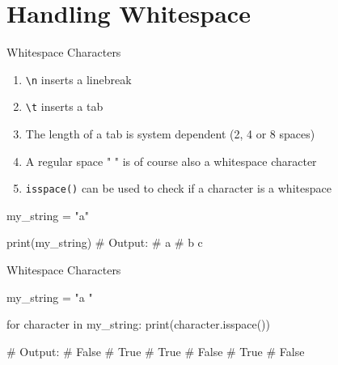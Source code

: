 \section{Handling Whitespace}

\begin{frame}[plain]
    \sectionpage
\end{frame}


\begin{frame}[fragile]{Whitespace Characters}
    
    \begin{enumerate}

    \item \texttt{\textbackslash n} inserts a linebreak
    \item \texttt{\textbackslash t} inserts a tab
    \item The length of a tab is system dependent (2, 4 or 8 spaces)
    \item A regular space " " is of course also a whitespace character
    \item \texttt{isspace()} can be used to check if a character is a whitespace

    \end{enumerate}

    \begin{pythoncode}

my_string = "a\nb\tc"

print(my_string)
# Output:
# a
# b    c
    
    \end{pythoncode}


\end{frame}

\begin{frame}[fragile]{Whitespace Characters}
    
    \begin{pythoncode}

my_string = "a \nb\tc"

for character in my_string:
    print(character.isspace())

# Output:
# False
# True
# True
# False
# True
# False
    
    \end{pythoncode}


\end{frame}



